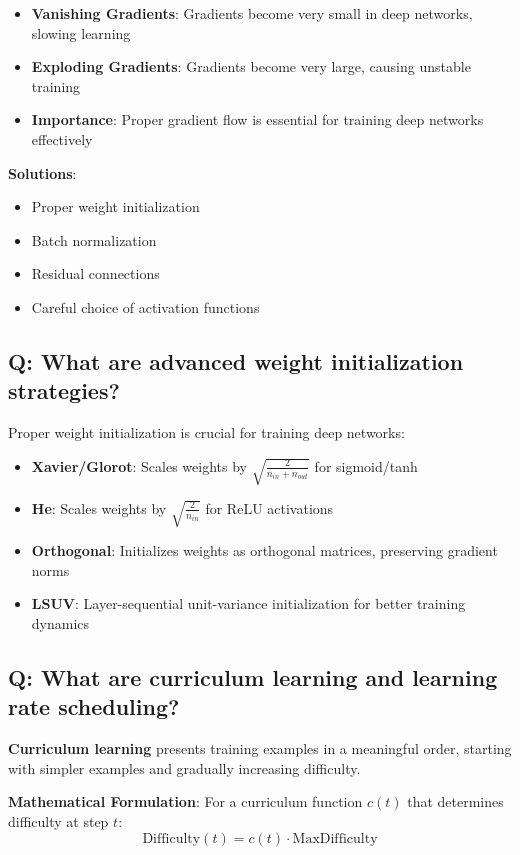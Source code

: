 \begin{itemize}
	\item \textbf{Vanishing Gradients}: Gradients become very small in deep networks, slowing learning
	\item \textbf{Exploding Gradients}: Gradients become very large, causing unstable training
	\item \textbf{Importance}: Proper gradient flow is essential for training deep networks effectively
\end{itemize}

\textbf{Solutions}:
\begin{itemize}
	\item Proper weight initialization
	\item Batch normalization
	\item Residual connections
	\item Careful choice of activation functions
\end{itemize}

\subsection*{\textcolor{primaryteal}{Q: What are advanced weight initialization strategies?}}
Proper weight initialization is crucial for training deep networks:

\begin{itemize}
	\item \textbf{Xavier/Glorot}: Scales weights by $\sqrt{\frac{2}{n_{in} + n_{out}}}$ for sigmoid/tanh
	\item \textbf{He}: Scales weights by $\sqrt{\frac{2}{n_{in}}}$ for ReLU activations
	\item \textbf{Orthogonal}: Initializes weights as orthogonal matrices, preserving gradient norms
	\item \textbf{LSUV}: Layer-sequential unit-variance initialization for better training dynamics
\end{itemize}

\subsection*{\textcolor{primaryteal}{Q: What are curriculum learning and learning rate scheduling?}}
\textbf{Curriculum learning} presents training examples in a meaningful order, starting with simpler examples and gradually increasing difficulty.

\textbf{Mathematical Formulation}: For a curriculum function \(c(t)\) that determines difficulty at step \(t\):
\[
\text{Difficulty}(t) = c(t) \cdot \text{MaxDifficulty}
\]


